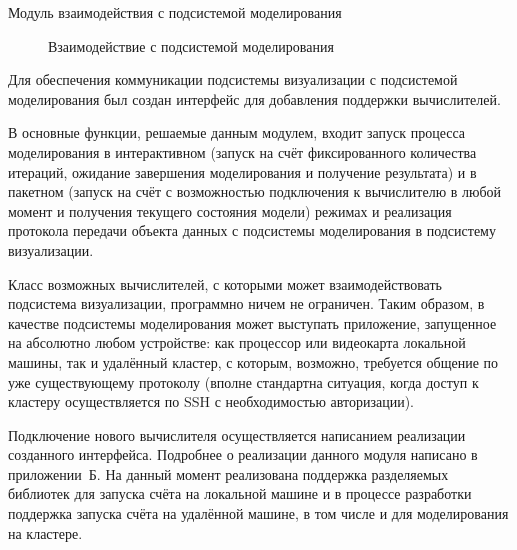 \documentclass[a4paper,12pt]{extarticle}
\begin{document}
\begin{subsection}{Модуль взаимодействия с подсистемой моделирования}
    \label{sec:architecture-calc}
    \begin{figure}[h]
        \caption{Взаимодействие с подсистемой моделирования}
        \label{ris:architecture-calc}
    \end{figure}
    
    Для обеспечения коммуникации подсистемы визуализации с подсистемой моделирования был создан интерфейс для добавления поддержки вычислителей.

    В основные функции, решаемые данным модулем, входит запуск процесса моделирования в интерактивном (запуск на счёт фиксированного количества итераций, ожидание завершения моделирования и получение результата) и в пакетном (запуск на счёт с возможностью подключения к вычислителю в любой момент и получения текущего состояния модели) режимах и реализация протокола передачи объекта данных с подсистемы моделирования в подсистему визуализации.

    Класс возможных вычислителей, с которыми может взаимодействовать подсистема визуализации, программно ничем не ограничен. Таким образом, в качестве подсистемы моделирования может выступать приложение, запущенное на абсолютно любом устройстве: как процессор или видеокарта локальной машины, так и удалённый кластер, с которым, возможно, требуется общение по уже существующему протоколу (вполне стандартна ситуация, когда доступ к кластеру осуществляется по SSH с необходимостью авторизации).

    Подключение нового вычислителя осуществляется написанием реализации созданного интерфейса. Подробнее о реализации данного модуля написано в приложении~Б. На данный момент реализована поддержка разделяемых библиотек для запуска счёта на локальной машине и в процессе разработки поддержка запуска счёта на удалённой машине, в том числе и для моделирования на кластере.
\end{subsection}
\end{document}
